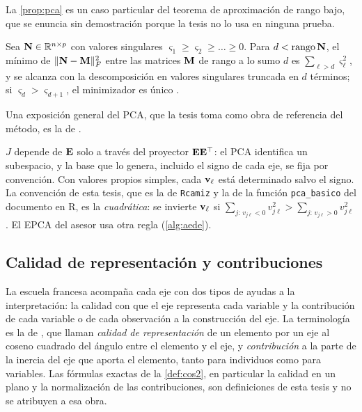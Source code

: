 La \cref{prop:pca} es un caso particular del teorema de aproximación de rango bajo, que se
enuncia sin demostración porque la tesis no lo usa en ninguna prueba.

\begin{teorema}\label{teo:eckart-young}
Sea $\mathbf{N}\in\mathbb{R}^{n\times p}$ con valores singulares $\varsigma_1\ge\varsigma_2\ge\dots\ge0$. Para
$d<\operatorname{rango}\mathbf{N}$, el mínimo de $\lVert \mathbf{N}-\mathbf{M}\rVert_{F}^2$ entre las matrices $\mathbf{M}$ de rango a lo sumo $d$ es
$\sum_{\ell>d}\varsigma_\ell^2$, y se alcanza con la descomposición en valores singulares
truncada en $d$ términos; si $\varsigma_d>\varsigma_{d+1}$, el minimizador es único
\parencite{eckart_young_1936}.
\end{teorema}

Una exposición general del PCA, que la tesis toma como obra de referencia del método, es la de
\textcite{jolliffe_2002}.

\begin{observacion}\label{obs:signo-pca}
$J$ depende de $\mathbf{E}$ solo a través del proyector $\mathbf{E}\mathbf{E}^{\top}$: el PCA identifica un subespacio, y
la base que lo genera, incluido el signo de cada eje, se fija por convención. Con valores propios
simples, cada $\mathbf{v}_\ell$ está determinado salvo el signo. La convención de esta tesis, que es la
de \texttt{Rcamiz} y la de la función \texttt{pca\_basico} del documento en R, es la
\emph{cuadrática}: se invierte $\mathbf{v}_\ell$ si
$\sum_{j:\,v_{j\ell}<0}v_{j\ell}^2>\sum_{j:\,v_{j\ell}>0}v_{j\ell}^2$. El EPCA del asesor usa otra
regla (\cref{alg:aede}).
\end{observacion}

\subsection{Calidad de representación y contribuciones}
\label{sec:cos2}

La escuela francesa acompaña cada eje con dos tipos de ayudas a la interpretación: la calidad con
que el eje representa cada variable y la contribución de cada variable o de cada observación a la
construcción del eje. La terminología es la de \textcite{escofier_pages_2023}, que llaman
\emph{calidad de representación} de un elemento por un eje al coseno cuadrado del ángulo entre el
elemento y el eje, y \emph{contribución} a la parte de la inercia del eje que aporta el elemento,
tanto para individuos como para variables. Las fórmulas exactas de la \cref{def:cos2}, en
particular la calidad en un plano y la normalización de las contribuciones, son definiciones de
esta tesis y no se atribuyen a esa obra.


